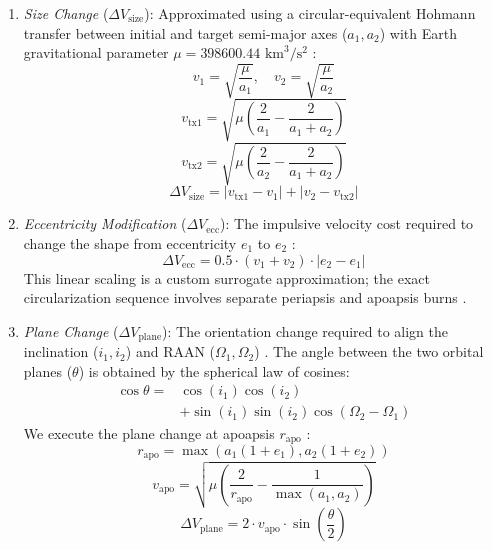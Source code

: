\documentclass[10pt,conference,a4paper]{IEEEtran}
\begin{document}
\begin{enumerate}
\item \textit{Size Change} ($\Delta V_{\text{size}}$): Approximated using a circular-equivalent Hohmann transfer between initial and target semi-major axes ($a_1, a_2$) with Earth gravitational parameter $\mu = 398600.44\text{ km}^3/\text{s}^2$ \cite{vallado}:
\begin{equation}
v_1 = \sqrt{\frac{\mu}{a_1}}, \quad v_2 = \sqrt{\frac{\mu}{a_2}}
\end{equation}
\begin{equation}
v_{\text{tx1}} = \sqrt{\mu \left(\frac{2}{a_1} - \frac{2}{a_1+a_2}\right)}
\end{equation}
\begin{equation}
v_{\text{tx2}} = \sqrt{\mu \left(\frac{2}{a_2} - \frac{2}{a_1+a_2}\right)}
\end{equation}
\begin{equation}
\Delta V_{\text{size}} = |v_{\text{tx1}} - v_1| + |v_2 - v_{\text{tx2}}|
\end{equation}

\item \textit{Eccentricity Modification} ($\Delta V_{\text{ecc}}$): The impulsive velocity cost required to change the shape from eccentricity $e_1$ to $e_2$ \cite{vallado}:
\begin{equation}
\Delta V_{\text{ecc}} = 0.5 \cdot (v_1 + v_2) \cdot |e_2 - e_1|
\end{equation}
This linear scaling is a custom surrogate approximation; the exact circularization sequence involves separate periapsis and apoapsis burns \cite{vallado}.

\item \textit{Plane Change} ($\Delta V_{\text{plane}}$): The orientation change required to align the inclination ($i_1, i_2$) and RAAN ($\Omega_1, \Omega_2$) \cite{vallado}. The angle between the two orbital planes ($\theta$) is obtained by the spherical law of cosines:
\begin{equation}
\begin{aligned}
\cos\theta = &\cos(i_1)\cos(i_2) \\
&+ \sin(i_1)\sin(i_2)\cos(\Omega_2 - \Omega_1)
\end{aligned}
\end{equation}
We execute the plane change at apoapsis $r_{\text{apo}}$ \cite{vallado}:
\begin{equation}
r_{\text{apo}} = \max\left(a_1(1+e_1), a_2(1+e_2)\right)
\end{equation}
\begin{equation}
v_{\text{apo}} = \sqrt{\mu \left(\frac{2}{r_{\text{apo}}} - \frac{1}{\max(a_1, a_2)}\right)}
\end{equation}
\begin{equation}
\Delta V_{\text{plane}} = 2 \cdot v_{\text{apo}} \cdot \sin\left(\frac{\theta}{2}\right)
\end{equation}


\end{enumerate}
\end{document}
